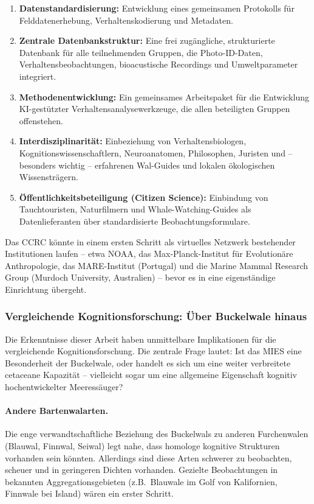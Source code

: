 ﻿\documentclass[12pt,a4paper]{article}
\theoremstyle{definition}
\theoremstyle{remark}
\begin{document}
\begin{enumerate}[leftmargin=*, label=\textbf{K\arabic*.}]
  \item \textbf{Datenstandardisierung:} Entwicklung eines gemeinsamen Protokolls
        für Felddatenerhebung, Verhaltenskodierung und Metadaten.
  \item \textbf{Zentrale Datenbankstruktur:} Eine frei zugängliche, strukturierte
        Datenbank für alle teilnehmenden Gruppen, die Photo-ID-Daten, Verhaltensbeobachtungen,
        bioacustische Recordings und Umweltparameter integriert.
  \item \textbf{Methodenentwicklung:} Ein gemeinsames Arbeitspaket für die Entwicklung
        KI-gestützter Verhaltensanalysewerkzeuge, die allen beteiligten Gruppen offenstehen.
  \item \textbf{Interdisziplinarität:} Einbeziehung von Verhaltensbiologen, Kognitionswissenschaftlern,
        Neuroanatomen, Philosophen, Juristen und -- besonders wichtig --
        erfahrenen Wal-Guides und lokalen ökologischen Wissensträgern.
  \item \textbf{Öffentlichkeitsbeteiligung (Citizen Science):} Einbindung von
        Tauchtouristen, Naturfilmern und Whale-Watching-Guides als Datenlieferanten
        über standardisierte Beobachtungsformulare.
\end{enumerate}

Das CCRC könnte in einem ersten Schritt als virtuelles Netzwerk bestehender Institutionen laufen -- etwa NOAA, das Max-Planck-Institut für Evolutionäre Anthropologie, das MARE-Institut (Portugal) und die Marine Mammal Research Group (Murdoch University, Australien) -- bevor es in eine eigenständige Einrichtung übergeht.

\subsubsection{Vergleichende Kognitionsforschung: Über Buckelwale hinaus}

Die Erkenntnisse dieser Arbeit haben unmittelbare Implikationen für die vergleichende Kognitionsforschung. Die zentrale Frage lautet: Ist das MIES eine Besonderheit der Buckelwale, oder handelt es sich um eine weiter verbreitete cetaceane Kapazität -- vielleicht sogar um eine allgemeine Eigenschaft kognitiv hochentwickelter Meeressäuger?

\paragraph{Andere Bartenwalarten.}
Die enge verwandtschaftliche Beziehung des Buckelwals zu anderen Furchenwalen (Blauwal, Finnwal, Seiwal) legt nahe, dass homologe kognitive Strukturen vorhanden sein könnten. Allerdings sind diese Arten schwerer zu beobachten, scheuer und in geringeren Dichten vorhanden. Gezielte Beobachtungen in bekannten Aggregationsgebieten (z.B.\ Blauwale im Golf von Kalifornien, Finnwale bei Island) wären ein erster Schritt.
\end{document}
